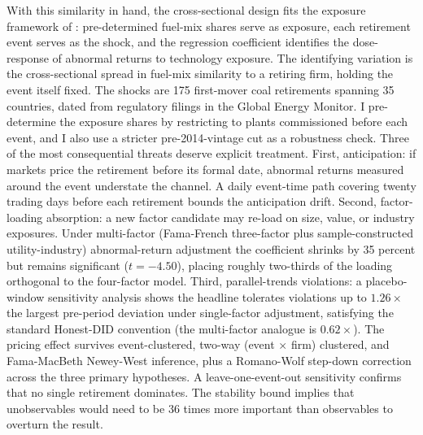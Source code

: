 \documentclass[12pt,a4paper]{article}
\begin{document}
With this similarity in hand, the cross-sectional design fits the exposure framework of \citet{BorusyakHullJaravel2022}: pre-determined fuel-mix shares serve as exposure, each retirement event serves as the shock, and the regression coefficient identifies the dose-response of abnormal returns to technology exposure. The identifying variation is the cross-sectional spread in fuel-mix similarity to a retiring firm, holding the event itself fixed. The shocks are 175 first-mover coal retirements spanning 35 countries, dated from regulatory filings in the Global Energy Monitor. I pre-determine the exposure shares by restricting to plants commissioned before each event, and I also use a stricter pre-2014-vintage cut as a robustness check. Three of the most consequential threats deserve explicit treatment. First, anticipation: if markets price the retirement before its formal date, abnormal returns measured around the event understate the channel. A daily event-time path covering twenty trading days before each retirement bounds the anticipation drift. Second, factor-loading absorption: a new factor candidate may re-load on size, value, or industry exposures. Under multi-factor (Fama-French three-factor plus sample-constructed utility-industry) abnormal-return adjustment the coefficient shrinks by 35 percent but remains significant ($t = -4.50$), placing roughly two-thirds of the loading orthogonal to the four-factor model. Third, parallel-trends violations: a placebo-window \citet{RambachanRoth2023} sensitivity analysis shows the headline tolerates violations up to $1.26\times$ the largest pre-period deviation under single-factor adjustment, satisfying the standard Honest-DID convention (the multi-factor analogue is $0.62\times$). The pricing effect survives event-clustered, two-way (event $\times$ firm) clustered, and Fama-MacBeth Newey-West inference, plus a Romano-Wolf step-down correction across the three primary hypotheses. A leave-one-event-out sensitivity confirms that no single retirement dominates. The \citet{Oster2019} stability bound implies that unobservables would need to be 36 times more important than observables to overturn the result.
\end{document}
